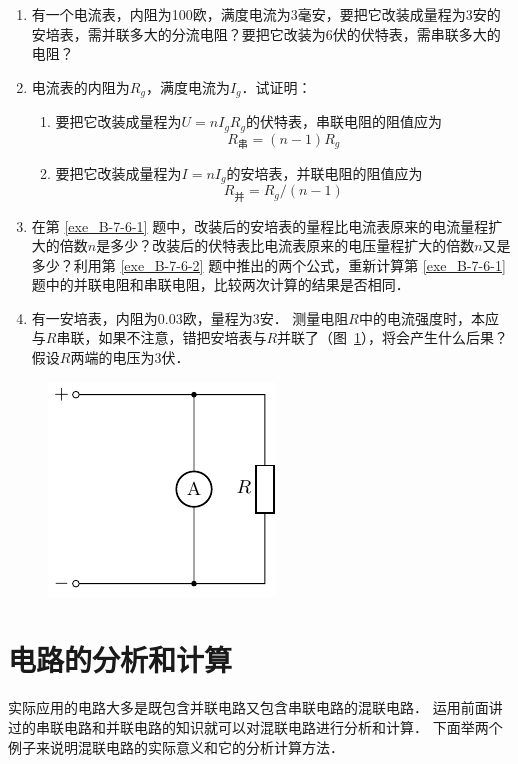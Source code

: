 \begin{enumerate}
    \item \label{exe_B-7-6-1}
    有一个电流表，内阻为100欧，满度电流为3毫安，要把它改装成量程为3安的安培表，需并联多大的分流电阻？要把它改装为6伏的伏特表，需串联多大的电阻？
    \item \label{exe_B-7-6-2}
    电流表的内阻为$R_g$，满度电流为$I_g$．试证明：
     \begin{enumerate}
         \item 要把它改装成量程为$U=nI_gR_g$的伏特表，串联电阻的阻值应为
         \[R_{\text{串}}=(n-1)R_g\]
         \item 要把它改装成量程为$I=nI_g$的安培表，并联电阻的阻值应为
         \[R_{\text{并}}=R_g/(n-1)\]
     \end{enumerate}
     \item 在第 \ref{exe_B-7-6-1} 题中，改装后的安培表的量程比电流表原来的电流量程扩大的倍数$n$是多少？改装后的伏特表比电流表原来的电压量程扩大的倍数$n$又是多少？利用第 \ref{exe_B-7-6-2} 题中推出的两个公式，重新计算第 \ref{exe_B-7-6-1} 题中的并联电阻和串联电阻，比较两次计算的结果是否相同．
     \item 有一安培表，内阻为0.03欧，量程为3安．
     测量电阻$R$中的电流强度时，本应与$R$串联，如果不注意，错把安培表与$R$并联了（图~\ref{fig_B_7-18}），将会产生什么后果？假设$R$两端的电压为3伏．
\end{enumerate}
\begin{figure}[htbp]
    \centering
    \includegraphics{fig/B/7-18.pdf}
    \caption{}\label{fig_B_7-18}
\end{figure}

\section{电路的分析和计算}

实际应用的电路大多是既包含并联电路又包含串联电路的混联电路．
运用前面讲过的串联电路和并联电路的知识就可以对混联电路进行分析和计算．
下面举两个例子来说明混联电路的实际意义和它的分析计算方法．

